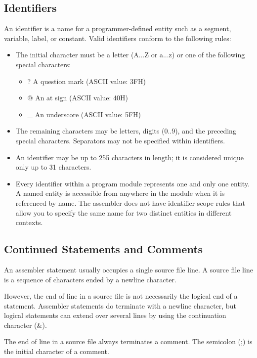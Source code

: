 \subsection*{Identifiers}
An identifier is a name for a programmer-defined entity such as a segment, variable, label, or constant. Valid identifiers conform to the following rules:
\begin{itemize}
\item The initial character must be a letter (A...Z or a...z) or one of the following special characters:
\begin{itemize}
\item ? A question mark (ASCII value: 3FH) 
\item @ An at sign (ASCII value: 40H)
\item \_ An underscore (ASCII value: 5FH)
\end{itemize}
\item The remaining characters may be letters, digits (0..9), and the preceding special characters. Separators may not be specified within identifiers.
\item An identifier may be up to 255 characters in length; it is considered unique only up to 31 characters.
\item Every identifier within a program module represents one and only one entity. A named entity is accessible from anywhere in the module when it is referenced by name. The assembler does not have identifier scope rules that allow you to specify the same name for two distinct entities in different contexts.
\end{itemize}
\subsection*{Continued Statements and Comments}
An assembler statement usually occupies a single source file line. A source file line is a sequence of characters ended by a newline character.

However, the end of line in a source file is not necessarily the logical end of a statement. Assembler statements do terminate with a newline character, but logical statements can extend over several lines by using the continuation character (\&).

The end of line in a source file always terminates a comment. The semicolon (;) is the initial character of a comment.

